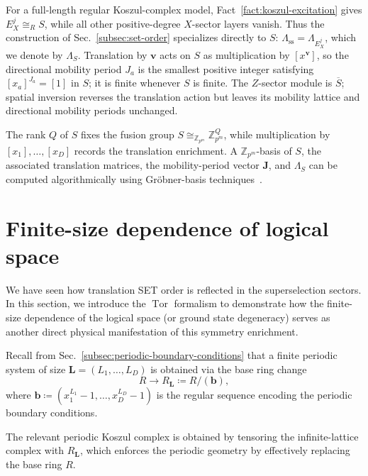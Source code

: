 \documentclass[aps,prx,english,superscriptaddress,twocolumn,tightenlines,showpacs,longbibliography,floatfix,amsfonts]{revtex4-2}
\theoremstyle{remark}
\theoremstyle{definition}
\begin{document}
For a full-length regular Koszul-complex model,
Fact~\ref{fact:koszul-excitation} gives \(E_X^j\cong_R S\),
while all other positive-degree \(X\)-sector layers vanish. Thus the
construction of Sec.~\ref{subsec:set-order} specializes directly to \(S\):
\(\Lambda_{\mathrm{ss}}=\Lambda_{E_X^j}\), which we denote by
\(\Lambda_S\). Translation by \(\mathbf v\) acts on \(S\) as multiplication
by \([x^{\mathbf v}]\), so the directional mobility period \(J_a\) is the
smallest positive integer satisfying
\([x_a]^{J_a}=[1]\) in \(S\); it is finite whenever \(S\) is finite. The
\(Z\)-sector module is \(\overline S\); spatial inversion reverses the
translation action but leaves its mobility lattice and directional mobility periods
unchanged.

The rank \(Q\) of \(S\) fixes the fusion group
\(S\cong_{\mathbb Z_{p^m}}\mathbb Z_{p^m}^Q\), while multiplication by
\([x_1],\dots,[x_D]\) records the translation enrichment. A
\(\mathbb Z_{p^m}\)-basis of \(S\), the associated translation matrices,
the mobility-period vector \(\mathbf J\), and \(\Lambda_S\) can be computed algorithmically
using Gr\"obner-basis techniques~\cite{Chen2025PRL, He2026PRB}.



\section{Finite-size dependence of logical space}
\label{sec:finite-size-logical}

We have seen how translation SET order is reflected in the superselection sectors. In this section, we introduce the $\operatorname{Tor}$ formalism to demonstrate how the finite-size dependence of the logical space (or ground state degeneracy) serves as another direct physical manifestation of this symmetry enrichment.

Recall from Sec.~\ref{subsec:periodic-boundary-conditions} that a finite periodic system of size $\mathbf{L} = (L_1,\dots,L_D)$ is obtained via the base ring change
\begin{equation}
	R \longrightarrow R_{\mathbf{L}} \coloneqq R/(\mathbf{b}),
\end{equation}
where $\mathbf{b} \coloneqq (x_1^{L_1}-1,\dots,x_D^{L_D}-1)$ is the regular sequence encoding the periodic boundary conditions.

The relevant periodic Koszul complex is obtained by tensoring the infinite-lattice complex with $R_{\mathbf{L}}$, which enforces the periodic geometry by effectively replacing the base ring $R$.
\end{document}

